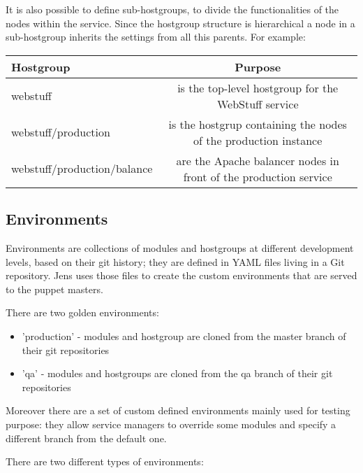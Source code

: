 It is also possible to define sub-hostgroups, to divide the
functionalities of the nodes within the service. Since the hostgroup
structure is hierarchical a node in a sub-hostgroup inherits the settings
from all this parents. For example: 

\begin{table}[H]
    \begin{center}
    \begin{tabular}{|l|c|}
        \hline
        \textbf{Hostgroup} & \textbf{Purpose} \\
        \hline
        webstuff & is the top-level hostgroup for the WebStuff service \\
        \hline
        webstuff/production & is the hostgrup containing the nodes of the production instance \\
        \hline
        webstuff/production/balance & are the Apache balancer nodes in front of the production service \\
        \hline
    \end{tabular}
    \end{center}
\end{table}

\subsection{Environments}

Environments are collections of modules and hostgroups at different
development levels, based on their git history; they are defined in YAML
files living in a Git repository. Jens uses those files to create the
custom environments that are served to the puppet masters.

There are two golden environments:

\begin{itemize}
    \item 'production' - modules and hostgroup are cloned from the master branch of
their git repositories
    \item 'qa' - modules and hostgroups are cloned from the qa branch of their git
repositories
\end{itemize}

Moreover there are a set of custom defined environments mainly used for
testing purpose: they allow service managers to override some modules and
specify a different branch from the default one.

There are two different types of environments:

